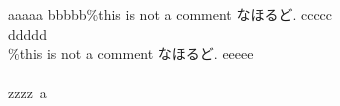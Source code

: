 aaaaa%
bbbbb\%this is not a comment なほるど.
ccccc\\%
ddddd\\\%this is not a comment なほるど.
eeeee\\\\%
zzzz\ a \\%
